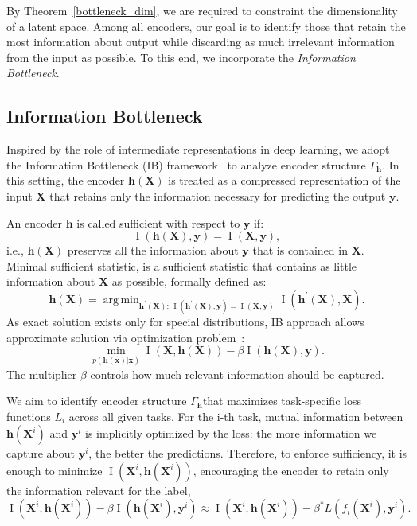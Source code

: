 \documentclass[14pt]{extarticle}
\DeclareMathOperator*{\argmin}{arg\,min}
\begin{document}
    By Theorem~\ref{bottleneck_dim}, we are required to constraint the dimensionality of a latent space. Among all encoders, our goal is to identify those that retain the most information about output while discarding as much irrelevant information from the input as possible. To this end, we incorporate the \textit{Information Bottleneck}.
    
    \subsection{Information Bottleneck}       
        Inspired by the role of intermediate representations in deep learning, we adopt the Information Bottleneck (IB) framework~\citep{Tishby2015DeepLA} to analyze encoder structure \(\Gamma_{\mathbf{h}}\). In this setting, the encoder \(\mathbf{h}(\mathbf{X})\) is treated as a compressed representation of the input \(\mathbf{X}\) that retains only the information necessary for predicting the output \(\mathbf{y}\).

        An encoder \(\mathbf{h}\) is called sufficient with respect to \(\mathbf{y}\) if: 
        \[
            \operatorname{I}(\mathbf{h}(\mathbf{X}), \mathbf{y}) = \operatorname{I}(\mathbf{X}, \mathbf{y}),
        \]
        i.e., \(\mathbf{h}(\mathbf{X})\) preserves all the information about \(\mathbf{y}\) that is contained in \(\mathbf{X}\). Minimal sufficient statistic, is a sufficient statistic that contains as little information about \(\mathbf{X}\) as possible, formally defined as:
        \[
            \mathbf{h}(\mathbf{X}) = \argmin_{\mathbf{h^{\prime}}(\mathbf{X}): \, \operatorname{I}(\mathbf{h^{\prime}}(\mathbf{X}), \mathbf{y}) = \operatorname{I}(\mathbf{X}, \mathbf{y})} \operatorname{I}(\mathbf{h^{\prime}}(\mathbf{X}), \mathbf{X}).
        \]
        As exact solution exists only for special distributions, IB approach allows approximate solution via optimization problem~\citep{shwartzziv2017openingblackboxdeep}:
        \[
            \min_{p(\mathbf{h({\mathbf{x}})} | \mathbf{x})} \operatorname{I}(\mathbf{X}, \mathbf{h}(\mathbf{X})) - \beta \operatorname{I}(\mathbf{h}(\mathbf{X}), \mathbf{y}).
        \]
        The multiplier \(\beta\) controls how much relevant information should be captured.

        We aim to identify encoder structure \(\Gamma_{\mathbf{h}}\)that maximizes task-specific loss functions \(L_i\) across all given tasks. For the i-th task, mutual information between \(\mathbf{h}(\mathbf{X}^i)\) and \(\mathbf{y}^i\) is implicitly optimized by the loss: the more information we capture about \(\mathbf{y}^i\), the better the predictions. Therefore, to enforce sufficiency, it is enough to minimize \(\operatorname{I}(\mathbf{X}^i, \mathbf{h}(\mathbf{X}^i))\), encouraging the encoder to retain only the information relevant for the label,
        \[
            \operatorname{I}(\mathbf{X}^i, \mathbf{h}(\mathbf{X}^i)) - \beta \operatorname{I}(\mathbf{h}(\mathbf{X}^i), \mathbf{y}^i) \approx \operatorname{I}(\mathbf{X}^i, \mathbf{h}(\mathbf{X}^i)) - \beta^* L(f_i(\mathbf{X}^i), \mathbf{y}^i).
        \]
\end{document}
